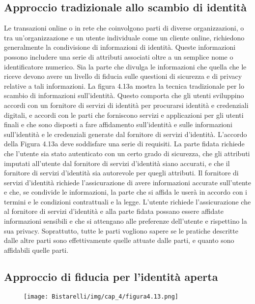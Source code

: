 \subsection{Approccio tradizionale allo scambio di identità}
Le transazioni online o in rete che coinvolgono parti di diverse organizzazioni, o tra un'organizzazione e un utente individuale come un cliente online, richiedono generalmente la condivisione di informazioni di identità. Queste informazioni possono includere una serie di attributi associati oltre a un semplice nome o identificatore numerico. Sia la parte che divulga le informazioni che quella che le riceve devono avere un livello di fiducia sulle questioni di sicurezza e di privacy relative a tali informazioni. La figura 4.13a mostra la tecnica tradizionale per lo scambio di informazioni sull'identità. Questo comporta che gli utenti sviluppino accordi con un fornitore di servizi di identità per procurarsi identità e credenziali digitali, e accordi con le parti che forniscono servizi e applicazioni per gli utenti finali e che sono disposti a fare affidamento sull'identità e sulle informazioni sull'identità e le credenziali generate dal fornitore di servizi d'identità. L'accordo della Figura 4.13a deve soddisfare una serie di requisiti. La parte fidata richiede che l'utente sia stato autenticato con un certo grado di sicurezza, che gli attributi imputati all'utente dal fornitore di servizi d'identità siano accurati, e che il fornitore di servizi d'identità sia autorevole per quegli attributi. Il fornitore di servizi d'identità richiede l'assicurazione di avere informazioni accurate sull'utente e che, se condivide le informazioni, la parte che si affida le userà in accordo con i termini e le condizioni contrattuali e la legge. L'utente richiede l'assicurazione che al fornitore di servizi d'identità e alla parte fidata possano essere affidate informazioni sensibili e che si attengano alle preferenze dell'utente e rispettino la sua privacy. Soprattutto, tutte le parti vogliono sapere se le pratiche descritte dalle altre parti sono effettivamente quelle attuate dalle parti, e quanto sono affidabili quelle parti.
\subsection{Approccio di fiducia per l'identità aperta}

\begin{figure}[H]
	\centering
    \texttt{[image: Bistarelli/img/cap\_4/figura4.13.png]}
\end{figure}


